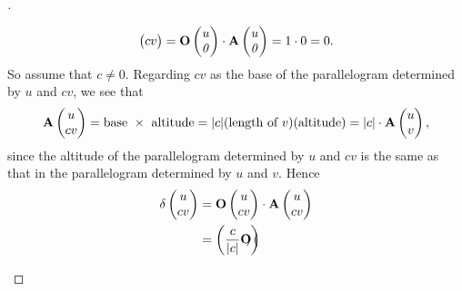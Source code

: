 \begin{proof}[]
\begin{enumerate}
\[\begin{pmatrix}
              cv
            \end{pmatrix} = \mathbf{O}\begin{pmatrix}
              u \\
              \mathit{0}
            \end{pmatrix} \cdot \mathbf{A}\begin{pmatrix}
              u \\
              \mathit{0}
            \end{pmatrix} = 1 \cdot 0 = 0.
          \]
          So assume that \(c \neq 0\).
          Regarding \(cv\) as the base of the parallelogram determined by \(u\) and \(cv\), we see that
          \[
            \mathbf{A}\begin{pmatrix}
              u \\
              cv
            \end{pmatrix} = \text{base } \times \text{ altitude} = \abs{c} (\text{length of } v) (\text{altitude}) = \abs{c} \cdot \mathbf{A}\begin{pmatrix}
              u \\
              v
            \end{pmatrix},
          \]
          since the altitude of the parallelogram determined by \(u\) and \(cv\) is the same as that in the parallelogram determined by \(u\) and \(v\).
          Hence
          \begin{align*}
            \delta\begin{pmatrix}
                    u \\
                    cv
                  \end{pmatrix} & = \mathbf{O}\begin{pmatrix}
                                                u \\
                                                cv
                                              \end{pmatrix} \cdot \mathbf{A}\begin{pmatrix}
                                                                              u \\
                                                                              cv
                                                                            \end{pmatrix}                                               \\
                                  & = \left\lparen\dfrac{c}{\left\lvert c\right\rvert} \mathbf{O}\begin{pmatrix}

\end{pmatrix}\right\rparen
\end{align*}
\end{enumerate}
\end{proof}

